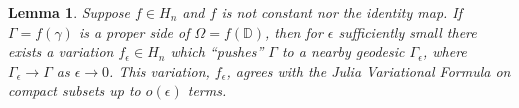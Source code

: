 \documentclass{lms}
\newcommand{\D}{\mathbb D}
\newtheorem{lemma}[theorem]{Lemma}
\numberwithin{equation}{section}
\begin{document}
\begin{lemma} \label{L:julia-out}
Suppose $f\in H_n$ and $f$ is not constant nor the identity map.
If $\Gamma=f(\gamma)$ is a proper side of $\Omega=f(\D)$, 
then for $\epsilon$ sufficiently small
there exists a variation $f_\epsilon\in H_n$ which ``pushes'' 
$\Gamma$ to a nearby geodesic $\Gamma_\epsilon$,  
where $\Gamma_\epsilon\to\Gamma$
as $\epsilon\to 0$. 
This variation, $f_\epsilon$, agrees with the Julia Variational Formula 
on compact subsets up to
$o(\epsilon)$ terms.
\end{lemma}
\end{document}
